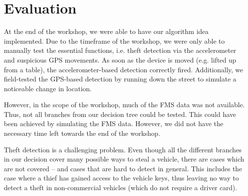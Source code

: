 \chapter{Evaluation}

At the end of the workshop, we were able to have our algorithm idea implemented. Due to the timeframe of the workshop, we were only able to manually test the essential functions, i.e. theft detection via the accelerometer and suspicious GPS movements. As soon as the device is moved (e.g. lifted up from a table), the accelerometer-based detection correctly fired. Additionally, we field-tested the GPS-based detection by running down the street to simulate a noticeable change in location.

However, in the scope of the workshop, much of the FMS data was not available. Thus, not all branches from our decision tree could be tested. This could have been achieved by simulating the FMS data. However, we did not have the necessary time left towards the end of the workshop.

Theft detection is a challenging problem. Even though all the different branches in our decision cover many possible ways to steal a vehicle, there are cases which are not covered -- and cases that are hard to detect in general. This includes the case where a thief has gained access to the vehicle keys, thus leaving no way to detect a theft in non-commercial vehicles (which do not require a driver card).


\clearpage